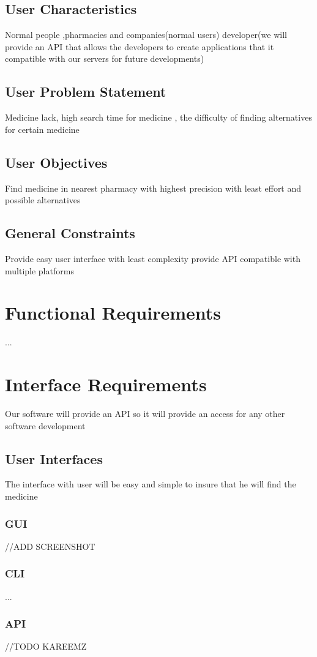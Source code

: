 \documentclass[]{article}
\begin{document}
\subsection{ User Characteristics}
Normal people ,pharmacies and companies(normal users) developer(we will provide an API that allows the developers to create applications that it compatible with our servers for future developments)
\subsection{ User Problem Statement}
Medicine lack, high search time for medicine , the difficulty of finding alternatives for certain medicine
\subsection{ User Objectives}
Find medicine in nearest pharmacy with highest precision with least effort and possible alternatives 
\subsection{ General Constraints}
Provide easy user interface with least complexity 
provide API compatible with multiple platforms


\section{Functional Requirements}
... 



\section{Interface Requirements}
Our software will provide an API so it will provide an access for any other software development
\subsection{User Interfaces}
The interface with user will be easy and simple to insure  that he will find the medicine
\subsubsection {GUI}
//ADD SCREENSHOT

\subsubsection {CLI}
...
\subsubsection {API}
//TODO KAREEMZ
\end{document}
